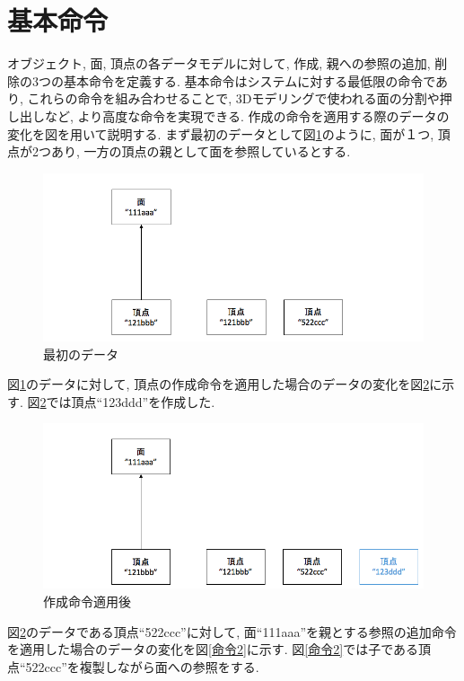 \section{基本命令} \label{ope}
オブジェクト, 面, 頂点の各データモデルに対して, 作成, 親への参照の追加, 削除の3つの基本命令を定義する.
基本命令はシステムに対する最低限の命令であり, これらの命令を組み合わせることで, 3Dモデリングで使われる面の分割や押し出しなど, より高度な命令を実現できる.
作成の命令を適用する際のデータの変化を図を用いて説明する.
まず最初のデータとして図\ref{命令0}のように, 面が１つ, 頂点が2つあり, 一方の頂点の親として面を参照しているとする.
\begin{figure}[htbp]
  \begin{center}
    \includegraphics[scale=0.45]{images/ope0}
    \caption{最初のデータ}
    \label{命令0}
  \end{center}
\end{figure}
図\ref{命令0}のデータに対して, 頂点の作成命令を適用した場合のデータの変化を図\ref{命令1}に示す. 図\ref{命令1}では頂点``123ddd''を作成した.
\begin{figure}[htbp]
  \begin{center}
    \includegraphics[scale=0.45]{images/ope1}
    \caption{作成命令適用後}
    \label{命令1}
  \end{center}
\end{figure}
図\ref{命令1}のデータである頂点``522ccc''に対して, 面``111aaa''を親とする参照の追加命令を適用した場合のデータの変化を図\ref{命令2}に示す. 図\ref{命令2}では子である頂点``522ccc''を複製しながら面への参照をする.
